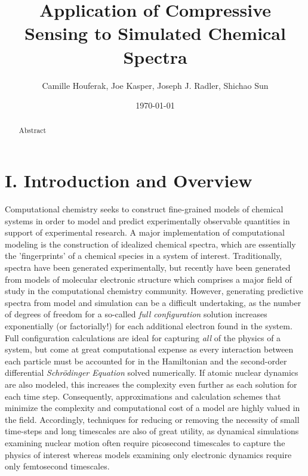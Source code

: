 \documentclass[11pt]{article}
\title{Application of Compressive Sensing to Simulated Chemical Spectra}
\author{Camille Houferak, Joe Kasper, Joseph J. Radler, Shichao Sun}
\date{\today}                                           %
\begin{document}
\maketitle
\begin{abstract}

Abstract

\end{abstract}


\section*{I.	Introduction and Overview}  %


\par Computational chemistry seeks to construct fine-grained models of chemical systems in order to model and predict experimentally observable quantities in support of experimental research.  A major implementation of computational modeling is the construction of idealized chemical spectra, which are essentially the 'fingerprints' of a chemical species in a system of interest.  Traditionally, spectra have been generated experimentally, but recently have been generated from models of molecular electronic structure which comprises a major field of study in the computational chemistry community.  However, generating predictive spectra from model and simulation can be a difficult undertaking, as the number of degrees of freedom for a so-called \emph{full configuration} solution increases exponentially (or factorially!) for each additional electron found in the system. Full configuration calculations are ideal for capturing \emph{all} of the physics of a system, but come at great computational expense as every interaction between each particle must be accounted for in the Hamiltonian and the second-order differential \emph{Schr\"odinger Equation} solved numerically.  If atomic nuclear dynamics are also modeled, this increases the complexity even further as each solution for each time step.  Consequently, approximations and calculation schemes that minimize the complexity and computational cost of a model are highly valued in the field. Accordingly, techniques for reducing or removing the necessity of small time-steps and long timescales are also of great utility, as dynamical simulations examining nuclear motion often require picosecond timescales to capture the physics of interest whereas models examining only electronic dynamics require only femtosecond timescales.\\ 
\end{document}
